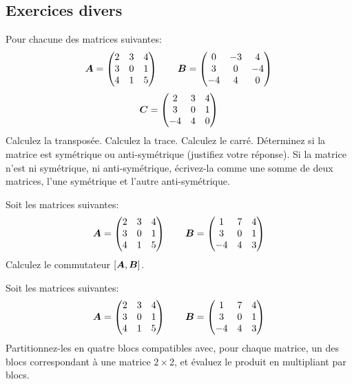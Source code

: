 \begin{TwoCol}
\section{Exercices divers}
 
 \begin{exercice}
 Pour chacune des matrices suivantes:
 \[
 \boldsymbol{A} = \begin{pmatrix}
 2 & 3 & 4 \\
 3 & 0 & 1 \\
 4 & 1 & 5
 \end{pmatrix}
 \qquad
 \boldsymbol{B} = \begin{pmatrix}
 0 & -3 & 4 \\
 3 & 0 & -4 \\
 -4 & 4 & 0
 \end{pmatrix}
\]
\[
 \boldsymbol{C} = \begin{pmatrix}
 2 & 3 & 4 \\
 3 & 0 & 1 \\
 -4 & 4 & 0
 \end{pmatrix}
 \]
  Calculez la transposée.
  Calculez la trace.
  Calculez le carré.
  Déterminez si la matrice est symétrique ou anti-symétrique (justifiez votre réponse).  
 Si la matrice n'est ni symétrique, ni anti-symétrique, écrivez-la comme une somme de deux matrices,
 l'une symétrique et l'autre anti-symétrique.
 \end{exercice}
 
  \begin{exercice}
 Soit les matrices suivantes:
 \[
 \boldsymbol{A} = \begin{pmatrix}
 2 & 3 & 4 \\
 3 & 0 & 1 \\
 4 & 1 & 5
 \end{pmatrix}
 \qquad
 \boldsymbol{B} = \begin{pmatrix}
 1 & 7 & 4 \\
 3 & 0 & 1 \\
 -4 & 4 & 3
 \end{pmatrix}
 \]
 Calculez le commutateur $[\boldsymbol{A}, \boldsymbol{B}]$.
 \end{exercice}
 
 \begin{exercice}
 Soit les matrices suivantes:
 \[
 \boldsymbol{A} = \begin{pmatrix}
 2 & 3 & 4 \\
 3 & 0 & 1 \\
 4 & 1 & 5
 \end{pmatrix}
 \qquad
 \boldsymbol{B} = \begin{pmatrix}
 1 & 7 & 4 \\
 3 & 0 & 1 \\
 -4 & 4 & 3
 \end{pmatrix}
 \]
 Partitionnez-les en quatre blocs compatibles avec, pour chaque matrice, un des blocs correspondant à
 une matrice $2\times 2$, et évaluez le produit en multipliant par blocs.
 \end{exercice}
 

\end{TwoCol}
